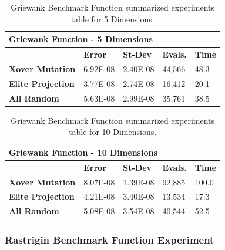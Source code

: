 \documentclass[graybox]{svmult}
\begin{document}
            \begin{table}[]
                \scriptsize
                \centering
                \caption{Griewank Benchmark Function summarized experiments table for 5 Dimensions.}\label{tab.fun_griewank5}
                \begin{tabular}{@{}lllll@{}}
                \toprule
                \multicolumn{5}{l}{\textbf{Griewank Function - 5 Dimensions}} \\ \midrule
                & \textbf{Error} & \textbf{St-Dev} & \textbf{Evals.} & \textbf{Time} \\
                \textbf{Xover Mutation} & 6.92E-08 & 2.40E-08 & 44,566 & 48.3 \\
                \textbf{Elite Projection} & 3.77E-08 & 2.74E-08 & 16,412 & 20.1 \\
                \textbf{All Random} & 5.63E-08 & 2.99E-08 & 35,761 & 38.5 \\ \bottomrule
                \end{tabular}
                \end{table}

            \begin{table}[]
                \scriptsize
                \centering
                \caption{Griewank Benchmark Function summarized experiments table for 10 Dimensions.}\label{tab.fun_griewank10}
                \begin{tabular}{@{}lllll@{}}
                \toprule
                \multicolumn{5}{l}{\textbf{Griewank Function - 10 Dimensions}} \\ \midrule
                & \textbf{Error} & \textbf{St-Dev} & \textbf{Evals.} & \textbf{Time} \\
                \textbf{Xover Mutation} & 8.07E-08 & 1.39E-08 & 92,885 & 100.0 \\
                \textbf{Elite Projection} & 4.21E-08 & 3.40E-08 & 13,534 & 17.3 \\
                \textbf{All Random} & 5.08E-08 & 3.54E-08 & 40,544 & 52.5 \\ \bottomrule
                \end{tabular}
                \end{table}

            \FloatBarrier


        \subsubsection{Rastrigin Benchmark Function Experiment}
\end{document}
